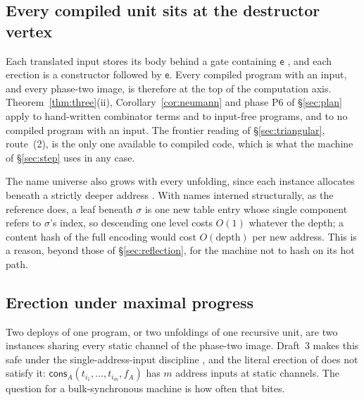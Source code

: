 \documentclass[11pt,a4paper]{article}
\theoremstyle{plain}
\theoremstyle{definition}
\theoremstyle{remark}
\newcommand{\ev}{\mathsf{e}}
\newcommand{\cons}{\mathsf{cons}}
\begin{document}
\subsection{Every compiled unit sits at the destructor vertex}

Each translated input stores its body behind a gate containing $\ev$
\cite[Lem.~6.2]{rhocomb3}, and each erection is a constructor followed by
$\ev$. Every compiled program with an input, and every phase-two image, is
therefore at the top of the computation axis. Theorem~\ref{thm:three}(ii),
Corollary~\ref{cor:neumann} and phase P6 of \S\ref{sec:plan} apply to
hand-written combinator terms and to input-free programs, and to no compiled
program with an input. The frontier reading of \S\ref{sec:triangular},
route~(2), is the only one available to compiled code, which is what the
machine of \S\ref{sec:step} uses in any case.

The name universe also grows with every unfolding, since each instance
allocates beneath a strictly deeper address \cite[Ex.~6.9]{rhocomb3}. With
names interned structurally, as the reference does, a leaf beneath $\sigma$ is
one new table entry whose single component refers to $\sigma$'s index, so
descending one level costs $O(1)$ whatever the depth; a content hash of the
full encoding would cost $O(\text{depth})$ per new address. This is a reason,
beyond those of \S\ref{sec:reflection}, for the machine not to hash on its
hot path.

\subsection{Erection under maximal progress}

Two deploys of one program, or two unfoldings of one recursive unit, are two
instances sharing every static channel of the phase-two image. Draft~3 makes
this safe under the single-address-input discipline \cite[Def.~6.10,
Lem.~6.11]{rhocomb3}, and the literal erection of \cite[Def.~6.8]{rhocomb3}
does not satisfy it: $\cons_{A}(t_{i_1},\dots,t_{i_m},f_{A})$ has $m$ address
inputs at static channels. The question for a bulk-synchronous machine is
how often that bites.
\end{document}
